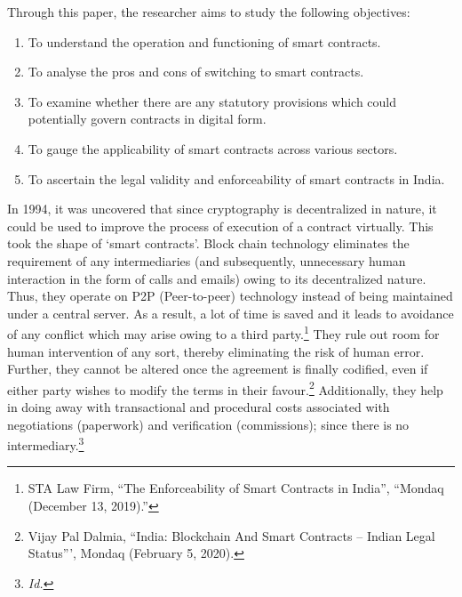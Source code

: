 \begin{multicols}{2}
\noi
Through this paper, the researcher aims to study the following objectives:

\vspace{-.3cm}

\begin{enumerate}[label=$\bullet$]
\itemsep=0pt
\item To understand the operation and functioning of smart contracts.
\item To analyse the pros and cons of switching to smart contracts.
\item To examine whether there are any statutory provisions which could potentially govern contracts in digital form.
\item To gauge the applicability of smart contracts across various sectors. 
\item To ascertain the legal validity and enforceability of smart contracts in India.
\vspace{-.2cm}
\end{enumerate}


\vspace{-.2cm}


\noi
In 1994, it was uncovered that since cryptography is decentralized in nature, it could be used
to improve the process of execution of a contract virtually. This took the shape of ‘smart
contracts’. Block chain technology eliminates the requirement of any intermediaries (and
subsequently, unnecessary human interaction in the form of calls and emails) owing to its
decentralized nature. Thus, they operate on P2P (Peer-to-peer) technology instead of being
maintained under a central server. As a result, a lot of time is saved and it leads to avoidance
of any conflict which may arise owing to a third party.\footnote{STA Law Firm, “The Enforceability of Smart Contracts in India”, “Mondaq (December 13, 2019).”}
 They rule out room for human
intervention of any sort, thereby eliminating the risk of human error. Further, they cannot be
altered once the agreement is finally codified, even if either party wishes to modify the terms
in their favour.\footnote{Vijay Pal Dalmia, “India: Blockchain And Smart Contracts – Indian Legal Status”’, Mondaq (February 5, 2020).}
 Additionally, they help in doing away with transactional and procedural costs
associated with negotiations (paperwork) and verification (commissions); since there is no
intermediary.\footnote{\textit{Id.}}


\end{multicols}
